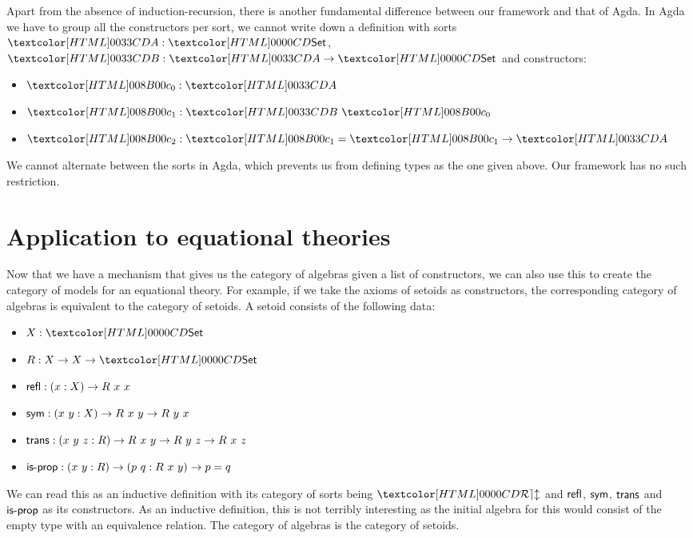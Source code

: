 Apart from the absence of induction-recursion, there is another
fundamental difference between our framework and that of Agda. In Agda
we have to group all the constructors per sort, \ie we cannot write
down a definition with sorts $\Aty : \Set$, $\Bty : \Aty \to \Set$ and
constructors:
%
\begin{itemize}
\item $\Aco : \Aty$
\item $\Bci : \Bty\ \Aco$
\item $\Acii : \Bci = \Bci \to \Aty$
\end{itemize}
%
We cannot alternate between the sorts in Agda, which prevents us from
defining types as the one given above. Our framework has no such
restriction.

\section{Application to equational theories}
\label{application-to-equational-theories}

Now that we have a mechanism that gives us the category of algebras
given a list of constructors, we can also use this to create the
category of models for an equational theory. For example, if we take
the axioms of setoids as constructors, the corresponding category of
algebras is equivalent to the category of setoids. A setoid consists
of the following data:
\begin{itemize}
\item $X : \Set$
\item $R : X \to X \to \Set$
\item $\ident{refl} : (x : X) \to R\ x\ x$
\item $\ident{sym} : (x\ y : X) \to R\ x\ y \to R\ y\ x$
\item $\ident{trans} : (x\ y\ z : R) \to R\ x\ y \to R\ y\ z \to R\ x\ z$
\item $\ident{is-prop} : (x\ y : R) \to (p\ q : R\ x\ y) \to p = q$
\end{itemize}
We can read this as an inductive definition with its category of sorts
being $\REL$ and $\ident{refl}$, $\ident{sym}$, $\ident{trans}$ and
$\ident{is-prop}$ as its constructors. As an inductive definition,
this is not terribly interesting as the initial algebra for this would
consist of the empty type with an equivalence relation. The category
of algebras is the category of setoids.
